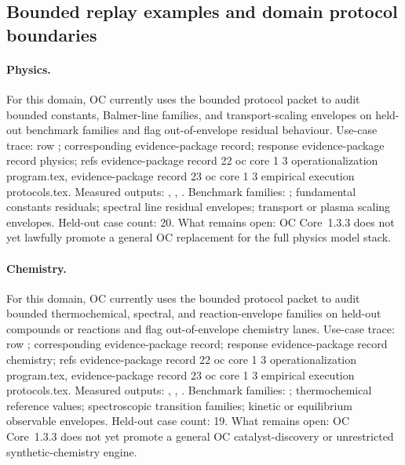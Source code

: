 \subsection{Bounded replay examples and domain protocol boundaries}

\paragraph{Physics.}
For this domain, OC currently uses the bounded protocol packet to audit bounded constants, Balmer-line families, and transport-scaling envelopes on held-out benchmark families and flag out-of-envelope residual behaviour.
Use-case trace: row ; corresponding evidence-package record; \allowbreak response evidence-package record physics; \allowbreak refs evidence-package record 22 oc core 1 3 operationalization program.tex, \allowbreak evidence-package record 23 oc core 1 3 empirical execution protocols.tex.
Measured outputs: , , .
Benchmark families: ; fundamental constants residuals; spectral line residual envelopes; transport or plasma scaling envelopes.
Held-out case count: 20.
What remains open: OC Core~1.3.3 does not yet lawfully promote a general OC replacement for the full physics model stack.

\paragraph{Chemistry.}
For this domain, OC currently uses the bounded protocol packet to audit bounded thermochemical, spectral, and reaction-envelope families on held-out compounds or reactions and flag out-of-envelope chemistry lanes.
Use-case trace: row ; corresponding evidence-package record; \allowbreak response evidence-package record chemistry; \allowbreak refs evidence-package record 22 oc core 1 3 operationalization program.tex, \allowbreak evidence-package record 23 oc core 1 3 empirical execution protocols.tex.
Measured outputs: , , .
Benchmark families: ; thermochemical reference values; spectroscopic transition families; kinetic or equilibrium observable envelopes.
Held-out case count: 19.
What remains open: OC Core~1.3.3 does not yet promote a general OC catalyst-discovery or unrestricted synthetic-chemistry engine.

